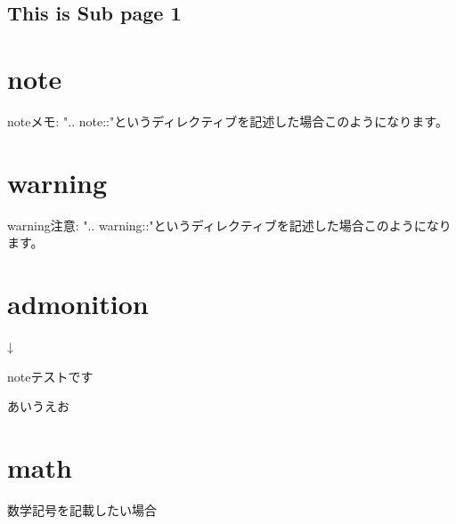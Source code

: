 \documentclass[letterpaper,10pt,dvipdfmx,openany,oneside]{sphinxmanual}
\begin{document}
\subsection{This is Sub page 1}
\label{\detokenize{2.chapter/subpage/sub2::doc}}\label{\detokenize{2.chapter/subpage/sub2:this-is-sub-page-1}}

\section{note}
\label{\detokenize{2.chapter/directive:note}}
\begin{sphinxadmonition}{note}{メモ:}
".. note::"というディレクティブを記述した場合このようになります。
\end{sphinxadmonition}


\section{warning}
\label{\detokenize{2.chapter/directive:warning}}
\begin{sphinxadmonition}{warning}{注意:}
".. warning::"というディレクティブを記述した場合このようになります。
\end{sphinxadmonition}


\section{admonition}
\label{\detokenize{2.chapter/directive:admonition}}
%
\begin{sphinxVerbatim}[commandchars=\\\{\}]
  

\end{sphinxVerbatim}

↓

\begin{sphinxadmonition}{note}{テストです}

あいうえお
\end{sphinxadmonition}


\section{math}
\label{\detokenize{2.chapter/directive:math}}
数学記号を記載したい場合

%
\begin{sphinxVerbatim}[commandchars=\\\{\}]
 

           
\end{sphinxVerbatim}
\end{document}
